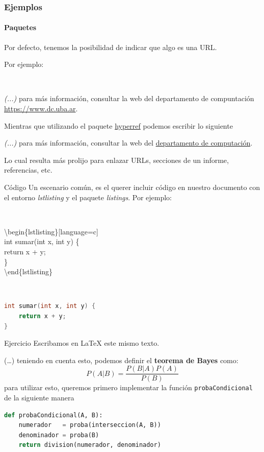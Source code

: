 \begin{frame}
\frametitle{Ejemplos}
\framesubtitle{Paquetes}

Por defecto, tenemos la posibilidad de indicar que algo es una URL. 

Por ejemplo:

\

\begin{center}
\textit{(...)} para más información, consultar la web del departamento de compuntación \url{https://www.dc.uba.ar}.
\end{center}

\pause

Mientras que utilizando el paquete \href{https://ctan.org/pkg/hyperref}{hyperref} podemos escribir lo siguiente


\begin{center}
\textit{(...)} para más información, consultar la web del \href{https://www.dc.uba.ar}{departamento de computación}.
\end{center}

Lo cual resulta más prolijo para enlazar URLs, secciones de un informe, referencias, etc.

\end{frame}

\begin{frame}[fragile]{Código}
Un escenario común, es el querer incluir código en nuestro documento con el \textcolor{codeorange}{entorno} \emph{lstlisting} y el \textcolor{codeorange}{paquete} \emph{listings}. Por ejemplo:

\

\textbackslash begin\{lstlisting\}[language=c] \\
int sumar(int x, int y) \{ \\
\hspace*{15pt} return x + y; \\
\} \\
\textbackslash end\{lstlisting\}

\

\begin{lstlisting}[language=c]
int sumar(int x, int y) {
    return x + y;
}
\end{lstlisting}

\end{frame}

\begin{frame}[fragile]{Ejercicio}
    Escribamos en \LaTeX{}  este mismo texto. 
    
    \begin{tcolorbox}[colframe=color1]
        (\ldots) teniendo en cuenta esto, podemos definir el \textbf{teorema de Bayes} como:
        \[P(A|B) = \frac{P(B|A)P(A)}{P(B)}\]
        para utilizar esto, queremos primero implementar la función \texttt{probaCondicional} de la siguiente manera
\begin{lstlisting}[language=python]
def probaCondicional(A, B):
    numerador   = proba(interseccion(A, B))
    denominador = proba(B)       
    return division(numerador, denominador)
\end{lstlisting}
\end{tcolorbox}
    
\end{frame}

